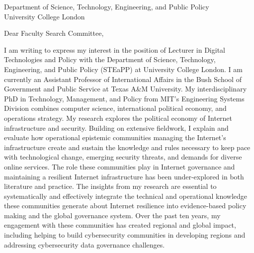 \documentclass[11pt]{letter}
\begin{document}
\begin{letter}
{
  \vspace{-3.5\baselineskip}

  Department of Science, Technology, Engineering, and Public Policy \\ 
  University College London
}

\opening{Dear Faculty Search Committee,}

I am writing to express my interest in the position of Lecturer in Digital Technologies and Policy with the Department of Science, Technology, Engineering, and Public Policy (STEaPP) at University College London.  
%
I am currently an Assistant Professor of International Affairs in the Bush School of Government and Public Service at Texas A\&M University.  
%
My interdisciplinary PhD in Technology, Management, and Policy from MIT's Engineering Systems Division combines computer science, international political economy, and operations strategy.
%
My research explores the political economy of Internet infrastructure and security.
%
Building on extensive fieldwork, I explain and evaluate how operational epistemic communities managing the Internet's infrastructure create and sustain the knowledge and rules necessary to keep pace with technological change, emerging security threats, and demands for diverse online services.
%
The role these communities play in Internet governance and maintaining a resilient Internet infrastructure has been under-explored in both literature and practice.
%
%
%
The insights from my research are essential to systematically and effectively integrate the technical and operational knowledge these communities generate about Internet resilience into evidence-based policy making and the global governance system.
%
Over the past ten years, my engagement with these communities has created  regional and global impact, including helping to build cybersecurity communities in developing regions and addressing cybersecurity data governance challenges.
%



\end{letter}
\end{document}

